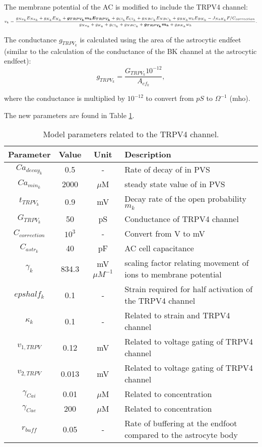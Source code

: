 			The membrane potential of the AC is modified to include the TRPV4 channel:
				\begin{equation}
				\centering
				\scriptsize{
				v_k = \frac{g_{Na_k} E_{Na_k} + g_{K_k} E_{K_k} + \bm{g_{TRPV_k} m_k E_{TRPV_k}} + 
				                g_{Cl_k} E_{Cl_k} + g_{NBC_k} E_{NBC_k} + 		                g_{BK_k} w_k E_{BK_k} - 
				                J_{NaK_k} F / C_{correction}}{ g_{Na_k} + g_{K_k} + g_{Cl_k} + g_{NBC_k} + \bm{ g_{TRPV_k} m_k } + g_{BK_k} w_k }.
				           }
				\end{equation}
			
			The conductance $g_{TRPV_k}$ is calculated using the area of the astrocytic endfeet (similar to the calculation of the conductance of the BK channel at the astrocytic endfeet):
				\begin{equation}
				g_{TRPV_k} = \frac{G_{TRPV_k} 10^{-12}}{A_{ef_k}},
				\end{equation}
			
			where the conductance is multiplied by $10^{-12}$ to convert from $pS$ to $\Omega^{-1}$ (mho).
			
			The new parameters are found in Table \ref{tab:NVU12trpv4param}. 
			
			\begin{table}[h!]
				\small
				\centering
					\begin{tabular}{c c c l}
				\hline
				Parameter & Value & Unit & Description \\
				\hline
				$Ca_{decay_k}$ & 0.5 & - & Rate of decay of \ca in PVS \\
				$Ca_{min_k}$ & 2000 & $\mu$M & steady state value of \ca in PVS \\
				$t_{TRPV_k}$ & 0.9 & mV & Decay rate of the open probability $m_k$ \\
				$G_{TRPV_k}$ & 50 & pS & Conductance of TRPV4 channel \\
				$C_{correction}$ & $10^3$ & - & Convert from V to mV \\
				$C_{astr_k}$ & 40 & pF & AC cell capacitance \\
				$\gamma_k$ & 834.3 & mV $\mu M^{-1}$ & scaling factor relating movement of ions to membrane potential \\
				$epshalf_k$ & 0.1 & - & Strain required for half activation of the TRPV4 channel \\
				$\kappa_k$ & 0.1 & - & Related to strain and TRPV4 channel \\
				$v_{1,TRPV}$ & 0.12 & mV & Related to voltage gating of TRPV4 channel \\
				$v_{2,TRPV}$ & 0.013 & mV & Related to voltage gating of TRPV4 channel \\
				$\gamma_{Cai}$ & 0.01 & $\mu$M & Related to \ca concentration \\
				$\gamma_{Cae}$ & 200 & $\mu$M & Related to \ca concentration \\
				$r_{buff}$ & 0.05 & - & Rate of \ca buffering at the endfoot compared to the astrocyte body \\
				\hline
					\end{tabular}
					\caption{Model parameters related to the TRPV4 channel.}
					\label{tab:NVU12trpv4param}
			\end{table}
			
